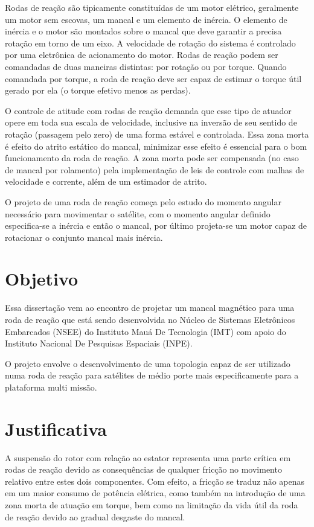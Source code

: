 Rodas de reação são tipicamente constituídas de um motor elétrico, geralmente um motor sem escovas, um mancal e um elemento de inércia.  O elemento de inércia e o motor são montados sobre o mancal que deve garantir a  precisa rotação em torno de um eixo. A velocidade de rotação do sistema é controlado por uma eletrônica de acionamento do motor. Rodas de reação podem ser comandadas de duas maneiras distintas: por rotação ou por torque. Quando comandada por torque, a roda de reação deve ser capaz de estimar o torque útil gerado por ela (o torque efetivo menos as perdas). 

O controle de atitude  com rodas de reação demanda que esse tipo de  atuador opere em toda sua escala de velocidade, inclusive na inversão de seu sentido de rotação (passagem pelo zero) de uma forma estável e controlada. Essa zona morta é efeito do atrito estático do mancal, minimizar esse efeito é essencial para o bom funcionamento da roda de reação. A zona morta pode ser compensada (no caso de mancal por rolamento) pela implementação de leis de controle com malhas de velocidade e corrente, além de um estimador de atrito.

O projeto de uma roda de reação começa pelo estudo do momento angular necessário para movimentar o satélite, com o momento angular definido especifica-se a inércia e então o mancal, por último projeta-se um motor capaz de rotacionar o conjunto mancal mais inércia.


\section{Objetivo}

Essa dissertação vem ao encontro de projetar um mancal magnético para uma roda de reação que está sendo desenvolvida no Núcleo de Sistemas Eletrônicos Embarcados (NSEE) do Instituto Mauá De Tecnologia (IMT) com apoio do Instituto Nacional De Pesquisas Espaciais (INPE).

O projeto envolve o desenvolvimento de uma topologia capaz de ser utilizado numa roda de reação para satélites de médio porte mais especificamente para a plataforma multi missão.


\section{Justificativa}

A suspensão do rotor com relação ao estator representa uma parte crítica em rodas de reação \citep{taniwaki2003experimental} devido as consequências de qualquer fricção no movimento relativo entre estes dois componentes. Com efeito, a fricção se traduz não apenas em um maior consumo de potência elétrica, como também na introdução de uma zona morta de atuação em torque, bem como na limitação da vida útil da roda de reação devido ao gradual desgaste do mancal.

